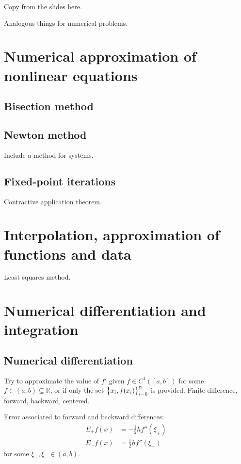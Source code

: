 \documentclass[palatino]{epflnotes}
\begin{document}
Copy from the slides here.

Analogous things for numerical problems.

\chapter{Numerical approximation of nonlinear equations}

\section{Bisection method}

\section{Newton method}

Include a method for systems.

\section{Fixed-point iterations}

Contractive application theorem.

\chapter{Interpolation, approximation of functions and data}

Least squares method.

\chapter{Numerical differentiation and integration}

\section{Numerical differentiation}

Try to approximate the value of $f'$ given $f ∈ C^1([a,b])$ for some $f ∈ (a,b) ⊆ ℝ$, or if only the set $\set{x_i, f(x_i)}_{i = 0}^n$ is provided. Finite difference, forward, backward, centered.

\begin{prop} Error associated to forward and backward differences: \begin{align*}
E_+f(x) &= -\frac{1}{2}hf''(ξ_+) \\
E_-f(x) &= \frac{1}{2}hf''(ξ_-)
\end{align*} for some $ξ_+, ξ_- ∈ (a,b)$.
\end{prop}
\end{document}
